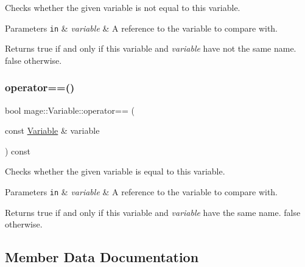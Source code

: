Checks whether the given variable is not equal to this variable.


\begin{DoxyParams}[1]{Parameters}
\mbox{\tt in}  & {\em variable} & A reference to the variable to compare with. \\
\hline
\end{DoxyParams}
\begin{DoxyReturn}{Returns}
{\ttfamily true} if and only if this variable and {\itshape variable} have not the same name. {\ttfamily false} otherwise. 
\end{DoxyReturn}
\hypertarget{structmage_1_1_variable_a5d1f7965ca7d0e29f6879cda014e8fa9}{}\label{structmage_1_1_variable_a5d1f7965ca7d0e29f6879cda014e8fa9} 
\subsubsection{\texorpdfstring{operator==()}{operator==()}}
{\footnotesize\ttfamily bool mage\+::\+Variable\+::operator== (\begin{DoxyParamCaption}\item[{const \hyperlink{structmage_1_1_variable}{Variable} \&}]{variable }\end{DoxyParamCaption}) const}

Checks whether the given variable is equal to this variable.


\begin{DoxyParams}[1]{Parameters}
\mbox{\tt in}  & {\em variable} & A reference to the variable to compare with. \\
\hline
\end{DoxyParams}
\begin{DoxyReturn}{Returns}
{\ttfamily true} if and only if this variable and {\itshape variable} have the same name. {\ttfamily false} otherwise. 
\end{DoxyReturn}


\subsection{Member Data Documentation}
\hypertarget{structmage_1_1_variable_afac262aa51bb1dfe447d501abcaa08d0}{}\label{structmage_1_1_variable_afac262aa51bb1dfe447d501abcaa08d0} 
